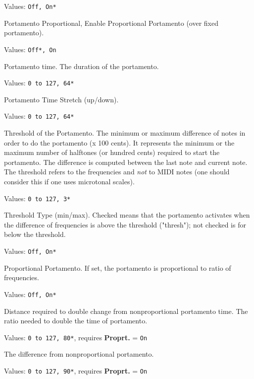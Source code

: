    Values: \texttt{Off, On*}

   Portamento Proportional,
   Enable Proportional Portamento (over fixed portamento).

   Values: \texttt{Off*, On}

   Portamento time.
   The duration of the portamento.

   Values: \texttt{0 to 127, 64*}

   Portamento Time Stretch (up/down).

   Values: \texttt{0 to 127, 64*}

   Threshold of the Portamento.
   The minimum or maximum difference of notes in order
   to do the portamento (x 100 cents).
   It represents the minimum or the maximum number of halftones (or hundred
   cents) required to start the portamento. The difference is computed
   between the last note and current note.
   The threshold refers to the frequencies and \textsl{not} to MIDI notes (one
   should consider this if one uses microtonal scales).

   Values: \texttt{0 to 127, 3*}

   Threshold Type (min/max).
   Checked means that the portamento activates when the difference of
   frequencies is above the threshold ("thresh"); not checked is for below
   the threshold.

   Values: \texttt{Off, On*}

   Proportional Portamento.
   If set, the portamento is proportional to ratio of frequencies.

   Values: \texttt{Off, On*}

   Distance required to double change from nonproportional
   portamento time.
   The ratio needed to double the time of portamento.

   Values: \texttt{0 to 127, 80*}, requires \textbf{Proprt.} = \texttt{On}

   The difference from nonproportional portamento.

   Values: \texttt{0 to 127, 90*}, requires \textbf{Proprt.} = \texttt{On}

